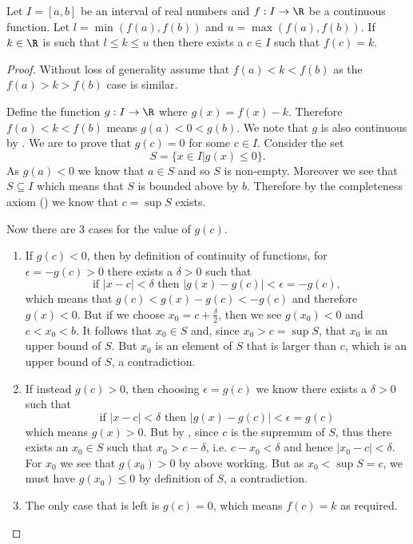 \begin{theorem}\label{thrm-intermediate-value-theorem}
    Let $I = [a, b]$ be an interval of real numbers and $f: I \to \R$ be a continuous function. Let $l = \min(f(a), f(b))$ and $u = \max(f(a), f(b))$. If $k \in \R$ is such that $l \leq k \leq u$ then there exists a $c \in I$ such that $f(c) = k$.
\end{theorem}
\begin{proof}
    Without loss of generality assume that $f(a) < k < f(b)$ as the $f(a) > k > f(b)$ case is similar.

    Define the function $g: I \to \R$ where $g(x) = f(x) - k$. Therefore $f(a) < k < f(b)$ means $g(a) < 0 < g(b)$. We note that $g$ is also continuous by . We are to prove that $g(c) = 0$ for some $c \in I$. Consider the set
    \[
        S = \{x \in I \vert g(x) \leq 0\}. 
    \]
    As $g(a) < 0$ we know that $a \in S$ and so $S$ is non-empty. Moreover we see that $S \subseteq I$ which means that $S$ is bounded above by $b$. Therefore by the completeness axiom () we know that $c = \sup S$ exists.

    Now there are 3 cases for the value of $g(c)$.
    \begin{enumerate}
        \item If $g(c) < 0$, then by definition of continuity of functions, for $\epsilon = -g(c) > 0$ there exists a $\delta > 0$ such that
        \[
            \text{if } |x - c| < \delta \text{ then } |g(x) - g(c)| < \epsilon = -g(c),
        \]
        which means that $g(c) < g(x) - g(c) < -g(c)$ and therefore $g(x) < 0$. But if we choose $x_0 = c + \frac\delta2$, then we see $g(x_0) < 0$ and $c < x_0 < b$. It follows that $x_0 \in S$ and, since $x_0 > c = \sup S$, that $x_0$ is an upper bound of $S$. But $x_0$ is an element of $S$ that is larger than $c$, which is an upper bound of $S$, a contradiction.

        \item If instead $g(c) > 0$, then choosing $\epsilon = g(c)$ we know there exists a $\delta > 0$ such that
        \[
            \text{if } |x - c| < \delta \text{ then } |g(x) - g(c)| < \epsilon = g(c)
        \]
        which means $g(x) > 0$. But by , since $c$ is the supremum of $S$, thus there exists an $x_0 \in S$ such that $x_0 > c - \delta$, i.e. $c - x_0 < \delta$ and hence $|x_0 - c| < \delta$. For $x_0$ we see that $g(x_0) > 0$ by above working. But as $x_0 < \sup S = c$, we must have $g(x_0) \leq 0$ by definition of $S$, a contradiction.

        \item The only case that is left is $g(c) = 0$, which means $f(c) = k$ as required.\qedhere
    \end{enumerate}
\end{proof}

